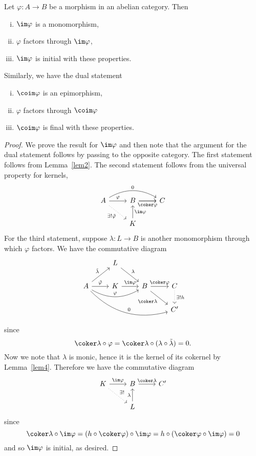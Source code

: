 \documentclass[10pt]{amsart}
\begin{document}
\begin{lem}\label{lem7}
  Let $\varphi : A \rightarrow B$ be a morphism in an abelian category.
  Then
  \begin{enumerate}[(i)]
  \item
    $\im\varphi$ is a monomorphism,
  \item
    $\varphi$ factors through $\im\varphi$,
  \item
    $\im\varphi$ is initial with these properties.
  \end{enumerate}
  Similarly, we have the dual statement
  \begin{enumerate}[(i)]
  \item
    $\coim\varphi$ is an epimorphism,
  \item
    $\varphi$ factors through $\coim\varphi$
  \item
    $\coim\varphi$ is final with these properties.
  \end{enumerate}

  \begin{proof}
    We prove the result for $\im\varphi$ and then note that the argument for the dual statement follows by passing to the opposite category.
    The first statement follows from Lemma~\ref{lem2}.
    The second statement follows from the universal property for kernels,
    $$\begin{tikzcd}
      A \arrow[swap,dotted]{rd}{\exists !\tilde{\varphi}}\arrow{r}{\varphi}\arrow[bend left]{rr}{0}& B \arrow[swap]{r}{\coker\varphi} \arrow{r} & C\\
      & K \arrow[swap]{u}{\im\varphi} &
    \end{tikzcd}$$
    For the third statement, suppose $\lambda : L \rightarrow B$ is another monomorphism through which $\varphi$ factors.
    We have the commutative diagram
    $$\begin{tikzcd}
      & L \arrow{dr}{\lambda}& &\\
      A \arrow[bend right]{drrr}{0}\arrow[bend right]{rr}{\varphi} \arrow{ur}{\tilde{\lambda}}\arrow{r}{\tilde\varphi} & K \arrow{r}{\im\varphi} & B \arrow[swap]{rd}{\coker\lambda}\arrow{r}{\coker\varphi} & C \arrow[dotted]{d}{\exists !h}\\
      & & & C^\prime
    \end{tikzcd}$$
    since
    $$\coker\lambda \circ \varphi = \coker\lambda \circ (\lambda \circ \tilde{\lambda}) = 0.$$
    Now we note that $\lambda$ is monic, hence it is the kernel of its cokernel by Lemma~\ref{lem4}.
    Therefore we have the commutative diagram
    $$\begin{tikzcd}
      K\arrow{r}{\im\varphi} \arrow[dotted]{rd}{\exists !}& B\arrow{r}{\coker\lambda} & C^\prime\\
      & L\arrow{u}{\lambda} &
    \end{tikzcd}$$
    since
    $$\coker\lambda \circ \im\varphi = (h \circ \coker\varphi) \circ \im\varphi = h \circ (\coker\varphi \circ \im\varphi) = 0$$
    and so $\im\varphi$ is initial, as desired.
  \end{proof}
\end{lem}
\end{document}
